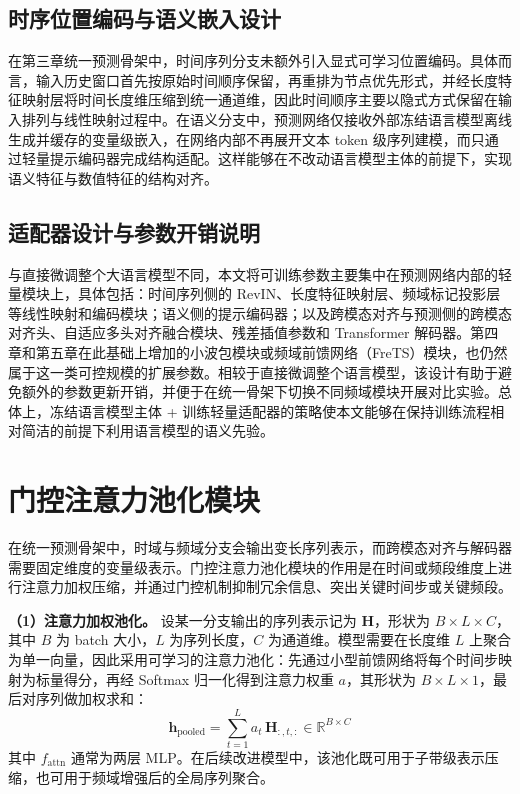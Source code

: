 \subsection{时序位置编码与语义嵌入设计}
在第三章统一预测骨架中，时间序列分支未额外引入显式可学习位置编码。具体而言，输入历史窗口首先按原始时间顺序保留，再重排为节点优先形式，并经长度特征映射层将时间长度维压缩到统一通道维，因此时间顺序主要以隐式方式保留在输入排列与线性映射过程中。在语义分支中，预测网络仅接收外部冻结语言模型离线生成并缓存的变量级嵌入，在网络内部不再展开文本 token 级序列建模，而只通过轻量提示编码器完成结构适配。这样能够在不改动语言模型主体的前提下，实现语义特征与数值特征的结构对齐。

\subsection{适配器设计与参数开销说明}
与直接微调整个大语言模型不同，本文将可训练参数主要集中在预测网络内部的轻量模块上，具体包括：时间序列侧的 RevIN、长度特征映射层、频域标记投影层等线性映射和编码模块；语义侧的提示编码器；以及跨模态对齐与预测侧的跨模态对齐头、自适应多头对齐融合模块、残差插值参数和 Transformer 解码器。第四章和第五章在此基础上增加的小波包模块或频域前馈网络（FreTS）模块，也仍然属于这一类可控规模的扩展参数。相较于直接微调整个语言模型，该设计有助于避免额外的参数更新开销，并便于在统一骨架下切换不同频域模块开展对比实验。总体上，冻结语言模型主体 + 训练轻量适配器的策略使本文能够在保持训练流程相对简洁的前提下利用语言模型的语义先验。

\section{门控注意力池化模块}
在统一预测骨架中，时域与频域分支会输出变长序列表示，而跨模态对齐与解码器需要固定维度的变量级表示。门控注意力池化模块的作用是在时间或频段维度上进行注意力加权压缩，并通过门控机制抑制冗余信息、突出关键时间步或关键频段。

\textbf{（1）注意力加权池化。} 设某一分支输出的序列表示记为 $\mathbf{H}$，形状为 $B\times L\times C$，其中 $B$ 为 batch 大小，$L$ 为序列长度，$C$ 为通道维。模型需要在长度维 $L$ 上聚合为单一向量，因此采用可学习的注意力池化：先通过小型前馈网络将每个时间步映射为标量得分，再经 Softmax 归一化得到注意力权重 $a$，其形状为 $B\times L\times 1$，最后对序列做加权求和：
\begin{equation}
\mathbf{h}_{\text{pooled}} = \sum_{t=1}^{L} a_t\,\mathbf{H}_{:,t,:} \in \mathbb{R}^{B\times C}
\label{eq:chap3-attention-pooling}
\end{equation}
其中 $f_{\text{attn}}$ 通常为两层 MLP。在后续改进模型中，该池化既可用于子带级表示压缩，也可用于频域增强后的全局序列聚合。

